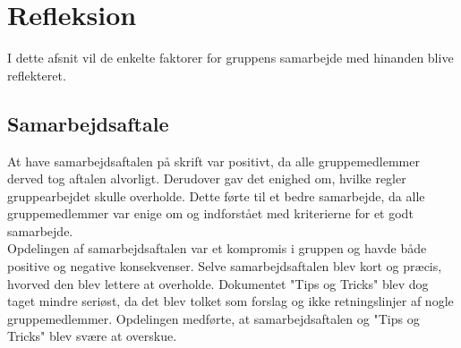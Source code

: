 \section{Refleksion}
I dette afsnit vil de enkelte faktorer for gruppens samarbejde med hinanden blive reflekteret.

\subsection{Samarbejdsaftale}
At have samarbejdsaftalen på skrift var positivt, da alle gruppemedlemmer derved tog aftalen alvorligt. Derudover gav det enighed om, hvilke regler gruppearbejdet skulle overholde. Dette førte til et bedre samarbejde, da alle gruppemedlemmer var enige om og indforstået med kriterierne for et godt samarbejde. \\
Opdelingen af samarbejdsaftalen var et kompromis i gruppen og havde både positive og negative konsekvenser. Selve samarbejdsaftalen blev kort og præcis, hvorved den blev lettere at overholde. Dokumentet "Tips og Tricks" blev dog taget mindre seriøst, da det blev tolket som forslag og ikke retningslinjer af nogle gruppemedlemmer. Opdelingen medførte, at samarbejdsaftalen og "Tips og Tricks" blev svære at overskue.

